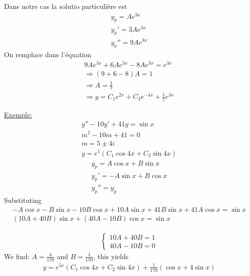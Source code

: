 Dans notre cas la solutio particulière est
\begin{eqnarray*}
	y_p=Ae^{3x}\\
	y_p'=3Ae^{3x}\\
	y_p''=9Ae^{3x}
\end{eqnarray*}
On remplace dans l'équation
\begin{eqnarray*}
	9Ae^{3x}+6Ae^{3x}-8Ae^{3x}=e^{3x}\\
	\Rightarrow (9+6-8)A=1\\
	\Rightarrow A=\frac{1}{7}\\
	\Rightarrow y=C_1e^{2x}+C_2e^{-4x}+\frac{1}{7}e^{3x}
\end{eqnarray*}

\underline{Exemple:}
\begin{eqnarray*}
	y''-10y'+41y=\sin{x}\\
	m^2-10m+41=0\\
	m=5\pm 4i\\
	y=e^{5}\left(C_1\cos{4x}+C_2\sin{4x}\right)
\end{eqnarray*}
\begin{eqnarray*}
	y_p=A\cos{x}+B\sin{x}\\
	y_p'=-A\sin{x}+B\cos{x}\\
	y_p''=y_p
\end{eqnarray*}
Substituting
\begin{eqnarray*}
	-A\cos{x}-B\sin x-10B\cos x+10A\sin x+41B\sin x+41A\cos x=\sin x\\
	(10A+40B)\sin x+(40A-10B)\cos x=\sin x
\end{eqnarray*}

\begin{eqnarray*}
	\begin{cases}
		10A+40B=1\\
		40A-10B=0
	\end{cases}
\end{eqnarray*}
We find: $A=\frac{4}{170}$ and $B=\frac{1}{170}$, this yields
\begin{eqnarray*}
	y=e^{5x}\left(C_1\cos 4x+C_2\sin 4x\right)+\frac{1}{170}(\cos x+4\sin x)
\end{eqnarray*}